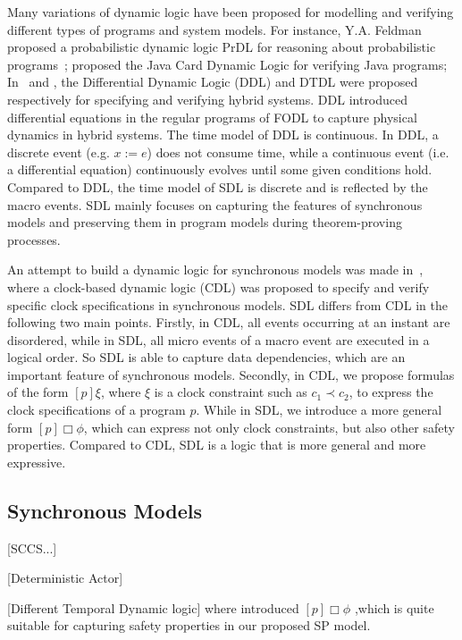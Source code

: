 \documentclass{fcs}
\begin{document}
Many variations of dynamic logic have been proposed for modelling and verifying different types of programs and system models.
For instance, Y.A. Feldman proposed a probabilistic dynamic logic PrDL for reasoning about probabilistic programs~\cite{Feldman84};
\cite{Rustan07} proposed the Java Card Dynamic Logic for verifying Java programs;
In~\cite{Platzer07b} and \cite{Platzer07}, the Differential Dynamic Logic (DDL) and DTDL were proposed respectively for specifying and verifying hybrid systems.
DDL introduced differential equations in the regular programs of FODL to capture physical dynamics in hybrid systems.
The time model of DDL is continuous.
In DDL, a discrete event (e.g. $x:=e$) does not consume time, while a continuous event (i.e. a differential equation) continuously evolves until some given conditions hold.
Compared to DDL, the time model of SDL is discrete and is reflected by the macro events.
SDL mainly focuses on capturing the features of synchronous models and preserving them in program models during theorem-proving processes.

An attempt to build a dynamic logic for synchronous models was made in~\cite{Zhang21}, where a clock-based dynamic logic (CDL) was proposed to specify and verify specific clock specifications in synchronous models.
SDL differs from CDL in the following two main points.
Firstly, in CDL, all events occurring at an instant are disordered, while in SDL, all micro events of a macro event are executed in a logical order.
So SDL is able to capture data dependencies, which are an important feature of synchronous models.
Secondly, in CDL, we propose formulas of the form $[p]\xi$, where $\xi$ is a clock constraint such as $c_1\prec c_2$, to express the clock specifications of a program $p$.
While in SDL, we introduce a more general form $[p]\Box\phi$, which can express not only clock constraints, but also other safety properties.
Compared to CDL, SDL is a logic that is more general and more expressive.


\ifx
\subsection{Synchronous Models}
[SCCS...]

[Deterministic Actor]

[Different Temporal Dynamic logic]
where introduced $[p]\Box\phi$ ,which is quite suitable for capturing safety properties in our proposed SP model.
\fi
\end{document}
